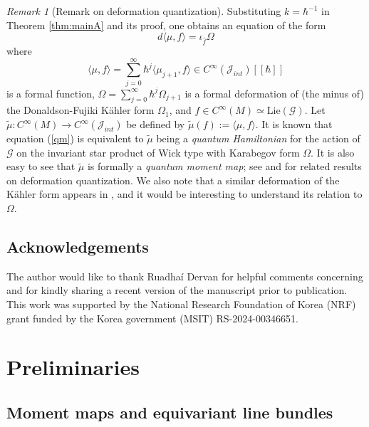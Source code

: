 \documentclass[12pt,reqno,a4paper]{amsart}
\numberwithin{equation}{section}
\theoremstyle{definition}
\theoremstyle{remark}
\newtheorem{remark}{Remark}
\begin{document}
\begin{remark}[Remark on deformation quantization]\label{deforquant}
Substituting $k=\hbar^{-1}$ in Theorem \ref{thm:mainA} and its proof, one obtains an equation of the form
\begin{equation}\label{qm}
    d\langle\mu, f\rangle=\iota_{\widehat{f}}\Omega
\end{equation}
where 
\begin{equation*}
\langle\mu, f\rangle=\sum_{j=0}^{\infty}\hbar^{j}\langle\mu_{j+1},f\rangle \in C^{\infty}(\mathcal{J}_{int})[[\hbar]]
\end{equation*}
is a formal function, $\Omega=\sum_{j=0}^{\infty}\hbar^j \Omega_{j+1}$ is a formal deformation of (the minus of) the Donaldson-Fujiki K\"ahler form $\Omega_1$, and $f\in C^{\infty}(M)\simeq \mathrm{Lie}(\mathcal{G})$. Let $\widetilde{\mu}:C^\infty(M)\rightarrow C^\infty(\mathcal{J}_{int})$ be defined by $\widetilde{\mu}(f):=\langle\mu, f\rangle$. It is known \cite[Deduction 4.1]{muller2004invariant} that equation (\ref{qm}) is equivalent to $\widetilde{\mu}$ being a \textit{quantum Hamiltonian} for the action of $\mathcal{G}$ on the invariant star product of Wick type with Karabegov form $\Omega$. It is also easy to see that $\widetilde{\mu}$ is formally a \textit{quantum moment map}; see \cite{xu1998fedosov,muller2004some,gutt2003natural,futaki2021quantum} and \cite{la2021formal,la2022scalar} for related results on deformation quantization. We also note that a similar deformation of the K\"ahler form appears in
\cite[(9.4)]{takhtajan2006quantum}, and it would be interesting to understand its relation to
$\Omega$.
\end{remark}


\subsection*{Acknowledgements}
The author would like to thank Ruadhaí Dervan for helpful comments concerning \cite{dervan2023universal} and for kindly sharing a recent version of the manuscript prior to publication. This work was supported by the National Research Foundation of Korea (NRF) grant funded by the Korea government (MSIT) RS-2024-00346651.



\section{Preliminaries}

\subsection{Moment maps and equivariant line bundles}\label{equivline}
\end{document}
